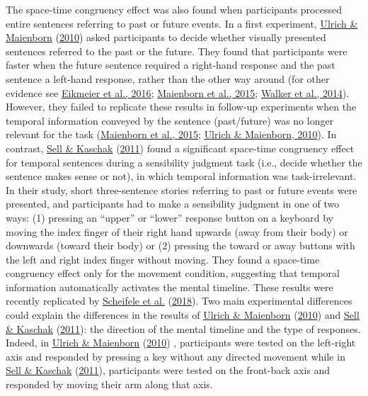 \documentclass[
  a4paper,12pt,twoside,onecolumn,openright,final,oldfontcommands]{memoir}
\begin{document}
The space-time congruency effect was also found when participants processed entire sentences referring to past or future events. In a first experiment, \protect\hyperlink{ref-ulrich_leftright_2010}{Ulrich \& Maienborn} (\protect\hyperlink{ref-ulrich_leftright_2010}{2010}) asked participants to decide whether visually presented sentences referred to the past or the future. They found that participants were faster when the future sentence required a right-hand response and the past sentence a left-hand response, rather than the other way around (for other evidence see \protect\hyperlink{ref-lewandowska-tomaszczyk_mental_2016}{Eikmeier et al., 2016}; \protect\hyperlink{ref-maienborn_we_2015}{Maienborn et al., 2015}; \protect\hyperlink{ref-walker_disentangling_2014}{Walker et al., 2014}). However, they failed to replicate these results in follow-up experiments when the temporal information conveyed by the sentence (past/future) was no longer relevant for the task (\protect\hyperlink{ref-maienborn_we_2015}{Maienborn et al., 2015}; \protect\hyperlink{ref-ulrich_leftright_2010}{Ulrich \& Maienborn, 2010}). In contrast, \protect\hyperlink{ref-sell_processing_2011}{Sell \& Kaschak} (\protect\hyperlink{ref-sell_processing_2011}{2011}) found a significant space-time congruency effect for temporal sentences during a sensibility judgment task (i.e., decide whether the sentence makes sense or not), in which temporal information was task-irrelevant. In their study, short three-sentence stories referring to past or future events were presented, and participants had to make a sensibility judgment in one of two ways: (1) pressing an ``upper'' or ``lower'' response button on a keyboard by moving the index finger of their right hand upwards (away from their body) or downwards (toward their body) or (2) pressing the toward or away buttons with the left and right index finger without moving. They found a space-time congruency effect only for the movement condition, suggesting that temporal information automatically activates the mental timeline. These results were recently replicated by \protect\hyperlink{ref-scheifele_replication_2018}{Scheifele et al.} (\protect\hyperlink{ref-scheifele_replication_2018}{2018}). Two main experimental differences could explain the differences in the results of \protect\hyperlink{ref-ulrich_leftright_2010}{Ulrich \& Maienborn} (\protect\hyperlink{ref-ulrich_leftright_2010}{2010}) and \protect\hyperlink{ref-sell_processing_2011}{Sell \& Kaschak} (\protect\hyperlink{ref-sell_processing_2011}{2011}): the direction of the mental timeline and the type of responses. Indeed, in \protect\hyperlink{ref-ulrich_leftright_2010}{Ulrich \& Maienborn} (\protect\hyperlink{ref-ulrich_leftright_2010}{2010}) , participants were tested on the left-right axis and responded by pressing a key without any directed movement while in \protect\hyperlink{ref-sell_processing_2011}{Sell \& Kaschak} (\protect\hyperlink{ref-sell_processing_2011}{2011}), participants were tested on the front-back axis and responded by moving their arm along that axis.
\end{document}
